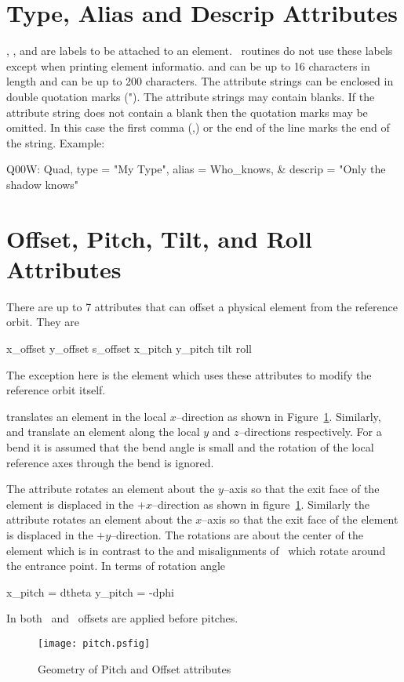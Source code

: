 \section{Type, Alias and Descrip Attributes}
\label{s:string}

, , and  are labels to be attached 
to an element. \bmad\ routines do not use these labels except 
when printing element informatio. 
and  can be up to 16 characters in length and 
can be up to 200 characters. The attribute strings can be enclosed in
double quotation marks ("). The attribute strings may contain
blanks. If the attribute string does not contain a blank then the
quotation marks may be omitted. In this case the first comma (,) or
the end of the line marks the end of the string. Example:
\begin{example}
  Q00W: Quad, type = "My Type", alias = Who_knows, &
                                  descrip = "Only the shadow knows"
\end{example}

\section{Offset, Pitch, Tilt, and Roll Attributes}
\label{s:offset}

There are up to 7 attributes that can offset a physical element
from the reference orbit. They are
\begin{example}
  x\_offset
  y\_offset
  s\_offset
  x\_pitch
  y\_pitch
  tilt
  roll
\end{example}
The exception here is the  element which uses these
attributes to modify the reference orbit itself.

 translates an element in the local $x$--direction
as shown in Figure~\ref{f:pitch}. Similarly,  and 
 translate an element along the local $y$ and 
$z$--directions respectively. For a bend it is assumed that
the bend angle is small and the rotation of the local reference
axes through the bend is ignored.

The  attribute rotates an element about the $y$--axis
so that the exit face of the element is displaced in the 
$+x$--direction as shown in figure~\ref{f:pitch}. Similarly
the  attribute rotates an element about the $x$--axis
so that the exit face of the element is displaced in the 
$+y$--direction. The rotations
are about the center of the element which is in contrast to the 
 and  misalignments of \mad\ which rotate
around the entrance point. In terms of rotation angle
\begin{example}
  x_pitch =  dtheta
  y_pitch = -dphi
\end{example}
In both \bmad\ and \mad\ offsets are applied before pitches.
\begin{figure}
  \centering
  \texttt{[image: pitch.psfig]}
  \caption{Geometry of Pitch and Offset attributes}
  \label{f:pitch}
\end{figure}

